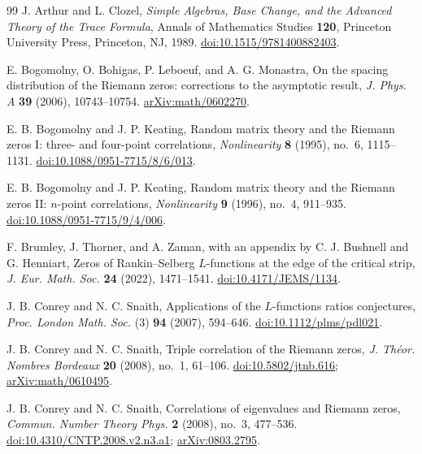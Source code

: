 \documentclass[11pt]{article}
\numberwithin{equation}{section}
\theoremstyle{remark}
\begin{document}
\begin{thebibliography}{99}
J. Arthur and L. Clozel,
\textit{Simple Algebras, Base Change, and the Advanced Theory of the Trace Formula},
Annals of Mathematics Studies \textbf{120}, Princeton University Press,
Princeton, NJ, 1989.
\href{https://doi.org/10.1515/9781400882403}{doi:10.1515/9781400882403}.

E. Bogomolny, O. Bohigas, P. Leboeuf, and A. G. Monastra,
On the spacing distribution of the Riemann zeros: corrections to the
asymptotic result, \textit{J. Phys. A} \textbf{39} (2006), 10743--10754.
\href{https://arxiv.org/abs/math/0602270}{arXiv:math/0602270}.

E. B. Bogomolny and J. P. Keating,
Random matrix theory and the Riemann zeros I: three- and four-point
correlations, \emph{Nonlinearity} \textbf{8} (1995), no.~6, 1115--1131.
\href{https://doi.org/10.1088/0951-7715/8/6/013}{doi:10.1088/0951-7715/8/6/013}.

E. B. Bogomolny and J. P. Keating,
Random matrix theory and the Riemann zeros II: $n$-point correlations,
\emph{Nonlinearity} \textbf{9} (1996), no.~4, 911--935.
\href{https://doi.org/10.1088/0951-7715/9/4/006}{doi:10.1088/0951-7715/9/4/006}.

F. Brumley, J. Thorner, and A. Zaman, with an appendix by C. J. Bushnell
and G. Henniart, Zeros of Rankin--Selberg $L$-functions at the edge of
the critical strip, \textit{J. Eur. Math. Soc.} \textbf{24} (2022),
1471--1541.
\href{https://doi.org/10.4171/JEMS/1134}{doi:10.4171/JEMS/1134}.

J. B. Conrey and N. C. Snaith, Applications of the $L$-functions ratios
conjectures, \textit{Proc. London Math. Soc.} (3) \textbf{94} (2007),
594--646. \href{https://doi.org/10.1112/plms/pdl021}{doi:10.1112/plms/pdl021}.

J. B. Conrey and N. C. Snaith,
Triple correlation of the Riemann zeros,
\emph{J. Th\'eor. Nombres Bordeaux} \textbf{20} (2008), no.~1, 61--106.
\href{https://doi.org/10.5802/jtnb.616}{doi:10.5802/jtnb.616}; \href{https://arxiv.org/abs/math/0610495}{arXiv:math/0610495}.

J. B. Conrey and N. C. Snaith,
Correlations of eigenvalues and Riemann zeros,
\emph{Commun. Number Theory Phys.} \textbf{2} (2008), no.~3, 477--536.
\href{https://doi.org/10.4310/CNTP.2008.v2.n3.a1}{doi:10.4310/CNTP.2008.v2.n3.a1}; \href{https://arxiv.org/abs/0803.2795}{arXiv:0803.2795}.


\end{thebibliography}
\end{document}
